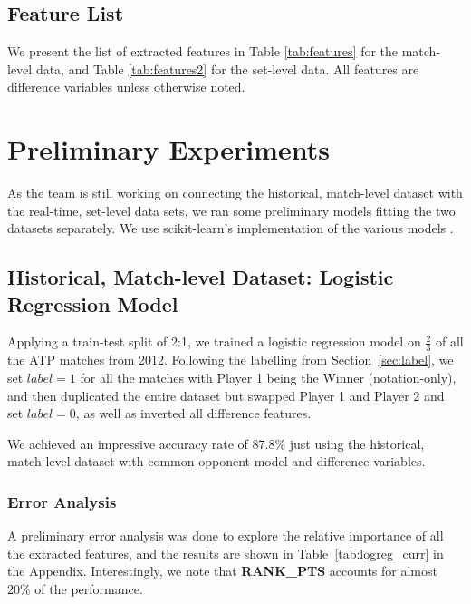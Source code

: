 \documentclass[paper=a4, fontsize=11pt]{scrartcl} %
\numberwithin{equation}{section} %
\numberwithin{figure}{section} %
\numberwithin{table}{section} %
\begin{document}
\subsection{Feature List}
We present the list of extracted features in Table \ref{tab:features} for the match-level data, and Table \ref{tab:features2} for the set-level data.  All features are difference variables unless otherwise noted. 



\section{Preliminary Experiments}
As the team is still working on connecting the historical, match-level dataset with the real-time, set-level data sets, we ran some preliminary models fitting the two datasets separately. We use scikit-learn's implementation of the various models \cite{scikit-learn}.
\subsection{Historical, Match-level Dataset: Logistic Regression Model}
Applying a train-test split of 2:1, we trained a logistic regression model on $\frac{2}{3}$ of all the ATP matches from 2012. Following the labelling from Section~\ref{sec:label}, we set $label = 1$ for all the matches with Player 1 being the Winner (notation-only), and then duplicated the entire dataset but swapped Player 1 and Player 2 and set $label = 0$, as well as inverted all difference features.

We achieved an impressive accuracy rate of 87.8\% just using the historical, match-level dataset with common opponent model and difference variables. 
\subsubsection{Error Analysis}
A preliminary error analysis was done to explore the relative importance of all the extracted features, and the results are shown in Table~\ref{tab:logreg_curr} in the Appendix. Interestingly, we note that \textbf{RANK\_PTS} accounts for almost $20\%$ of the performance. 
\end{document}
